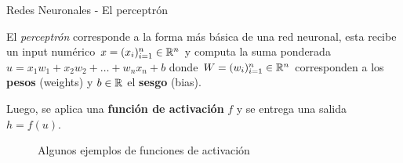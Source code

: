 \documentclass[handout, 9pt]{beamer}
\begin{document}
\begin{frame}{Redes Neuronales - El perceptrón}

El \textit{perceptrón} corresponde a la forma más básica de una red neuronal, esta recibe un input numérico $x = (x_i)_{i=1}^n \in \mathbb{R}^n$ y computa la suma ponderada $u = x_1w_1 + x_2w_2 + \dots + w_nx_n + b$ donde $W = (w_i)_{i=1}^n \in \mathbb{R}^n$ corresponden a los \textbf{pesos} (weights) y $b \in \mathbb{R}$ el \textbf{sesgo} (bias). \pause 

Luego, se aplica una \textbf{función de activación} $f$ y se entrega una salida $h = f(u)$. \pause 
\begin{figure}[H]
  \centering
  \caption{Algunos ejemplos de funciones de activación}
\end{figure}

\end{frame}
\end{document}
